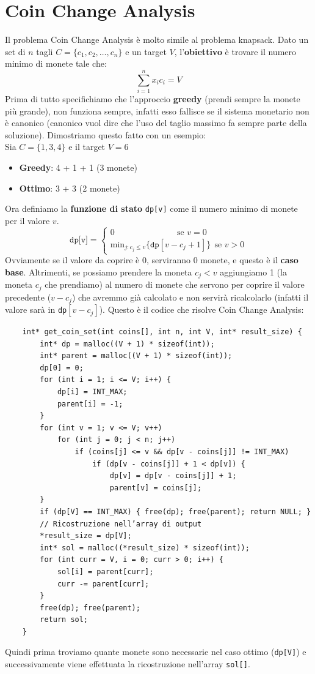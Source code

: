 \section{Coin Change Analysis} \label{Coin Change Analysis}
Il problema Coin Change Analysis è molto simile al problema knapsack. Dato un set di $n$ tagli $C = \{c_1,c_2,\dots , c_n\}$ e un target $V$, 
l'\textbf{obiettivo} è trovare il numero minimo di monete tale che:
\[ \sum_{i =1}^{n} x_i c_i = V  \]
Prima di tutto specifichiamo che l'approccio \textbf{greedy} (prendi sempre la monete più grande), non funziona sempre, infatti esso fallisce se il
sistema monetario non è canonico (canonico vuol dire che l'uso del taglio massimo fa sempre parte della soluzione). Dimostriamo questo fatto con un
esempio:\smallskip\\
Sia $C = \{ 1,3,4 \}$ e il target $V = 6$
\begin{itemize}
    \item \textbf{Greedy}: 4 + 1 + 1 (3 monete)
    \item \textbf{Ottimo}: 3 + 3 (2 monete)
\end{itemize} 
Ora definiamo la \textbf{funzione di stato} \texttt{dp[v]} come il numero minimo di monete per il valore $v$.
\[    
\texttt{dp[v]} = \begin{cases}
    0 \ \ \ \ \ \ \ \ \ \ \ \ \ \ \ \ \ \ \ \ \ \ \ \ \ \ \ \ \ \ \ \ \  \text{se } v = 0 \\
    \text{min}_{j:c_j \le v} \{ \texttt{dp}[v - c_j + 1]  \}\ \ \text{se } v >0
\end{cases}
\]
Ovviamente se il valore da coprire è 0, serviranno 0 monete, e questo è il \textbf{caso base}. Altrimenti, se possiamo prendere la moneta
$c_j < v$ aggiungiamo 1 (la moneta $c_j$ che prendiamo) al numero di monete che servono per coprire il valore precedente ($v-c_j$) che avremmo 
già calcolato e non servirà ricalcolarlo (infatti il valore sarà in \texttt{dp}$[v-c_j]$). Questo è il codice che risolve Coin Change Analysis:
\begin{verbatim}
    int* get_coin_set(int coins[], int n, int V, int* result_size) {
        int* dp = malloc((V + 1) * sizeof(int));
        int* parent = malloc((V + 1) * sizeof(int));
        dp[0] = 0;
        for (int i = 1; i <= V; i++) {
            dp[i] = INT_MAX;
            parent[i] = -1;
        }
        for (int v = 1; v <= V; v++)
            for (int j = 0; j < n; j++)
                if (coins[j] <= v && dp[v - coins[j]] != INT_MAX)
                    if (dp[v - coins[j]] + 1 < dp[v]) {
                        dp[v] = dp[v - coins[j]] + 1;
                        parent[v] = coins[j];
        }
        if (dp[V] == INT_MAX) { free(dp); free(parent); return NULL; }
        // Ricostruzione nell’array di output
        *result_size = dp[V];
        int* sol = malloc((*result_size) * sizeof(int));
        for (int curr = V, i = 0; curr > 0; i++) {
            sol[i] = parent[curr];
            curr -= parent[curr];
        }
        free(dp); free(parent);
        return sol;
    }
\end{verbatim}
Quindi prima troviamo quante monete sono necessarie nel caso ottimo (\texttt{dp[V]}) e successivamente viene effettuata la ricostruzione nell'array
\texttt{sol[]}.



